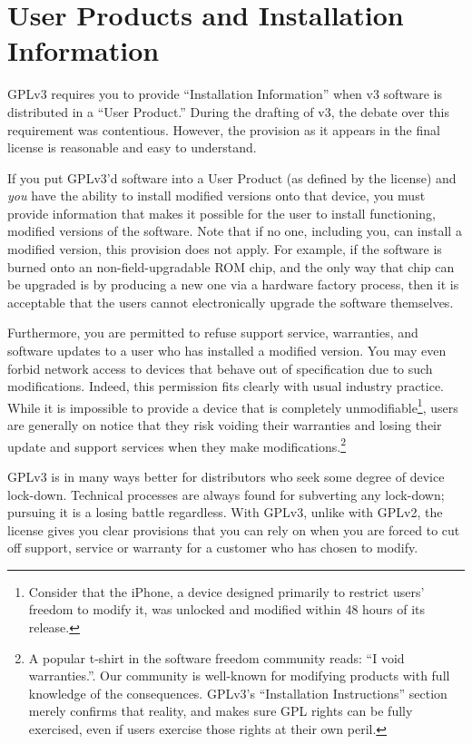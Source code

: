
\section{User Products and Installation Information}
\label{user-products}

GPLv3 requires you to provide ``Installation Information'' when v3
software is distributed in a ``User Product.''  During the drafting of v3,
the debate over this requirement was contentious.  However, the provision
as it appears in the final license is reasonable and easy to understand.

If you put GPLv3'd software into a User Product (as defined by the
license) and \emph{you} have the ability to install modified versions onto
that device, you must provide information that makes it possible for the
user to install functioning, modified versions of the software.  Note that
if no one, including you, can install a modified version, this provision
does not apply.  For example, if the software is burned onto an
non-field-upgradable ROM chip, and the only way that chip can be upgraded
is by producing a new one via a hardware factory process, then it is
acceptable that the users cannot electronically upgrade the software
themselves.

Furthermore, you are permitted to refuse support service, warranties, and
software updates to a user who has installed a modified version.  You may
even forbid network access to devices that behave out of specification due
to such modifications.  Indeed, this permission fits clearly with usual
industry practice.  While it is impossible to provide a device that is
completely unmodifiable\footnote{Consider that the iPhone, a device
  designed primarily to restrict users' freedom to modify it, was unlocked
  and modified within 48 hours of its release.}, users are generally on
notice that they risk voiding their warranties and losing their update and
support services when they make modifications.\footnote{A popular t-shirt
  in the software freedom community reads: ``I void warranties.''.  Our community is
  well-known for modifying products with full knowledge of the
  consequences.  GPLv3's ``Installation Instructions'' section merely
  confirms that reality, and makes sure GPL rights can be fully exercised,
  even if users exercise those rights at their own peril.}

GPLv3 is in many ways better for distributors who seek some degree of
device lock-down.  Technical processes are always found for subverting any
lock-down; pursuing it is a losing battle regardless.  With GPLv3, unlike
with GPLv2, the license gives you clear provisions that you can rely on
when you are forced to cut off support, service or warranty for a customer
who has chosen to modify.

